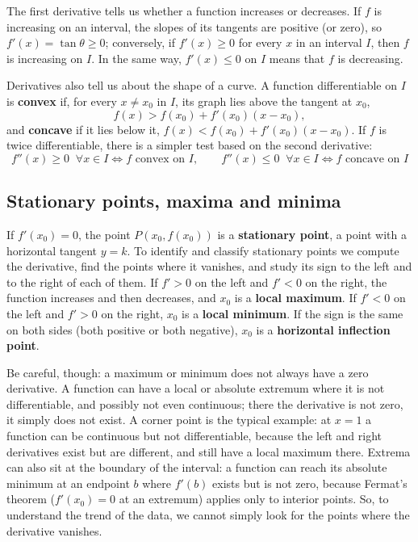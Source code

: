 \documentclass[letterpaper,11pt,leqno]{book}
\begin{document}
The first derivative tells us whether a function increases or decreases. If $f$ is increasing on an interval, the slopes of its tangents are positive (or zero), so $f'(x) = \tan\theta \ge 0$; conversely, if $f'(x) \ge 0$ for every $x$ in an interval $I$, then $f$ is increasing on $I$. In the same way, $f'(x) \le 0$ on $I$ means that $f$ is decreasing.

Derivatives also tell us about the shape of a curve. A function differentiable on $I$ is \textbf{convex} if, for every $x \neq x_0$ in $I$, its graph lies above the tangent at $x_0$,
\begin{equation}
f(x) > f(x_0) + f'(x_0)(x - x_0),
\label{eq:convexity_tangent_def}
\end{equation}
and \textbf{concave} if it lies below it, $f(x) < f(x_0) + f'(x_0)(x - x_0)$. If $f$ is twice differentiable, there is a simpler test based on the second derivative:
\begin{equation}
\boxed{f''(x) \ge 0 \;\; \forall x \in I \iff f \text{ convex on } I, \qquad f''(x) \le 0 \;\; \forall x \in I \iff f \text{ concave on } I}
\label{eq:second_derivative_convexity}
\end{equation}

\subsection{Stationary points, maxima and minima}

If $f'(x_0) = 0$, the point $P(x_0, f(x_0))$ is a \textbf{stationary point}, a point with a horizontal tangent $y = k$. To identify and classify stationary points we compute the derivative, find the points where it vanishes, and study its sign to the left and to the right of each of them. If $f' > 0$ on the left and $f' < 0$ on the right, the function increases and then decreases, and $x_0$ is a \textbf{local maximum}. If $f' < 0$ on the left and $f' > 0$ on the right, $x_0$ is a \textbf{local minimum}. If the sign is the same on both sides (both positive or both negative), $x_0$ is a \textbf{horizontal inflection point}.

Be careful, though: a maximum or minimum does not always have a zero derivative. A function can have a local or absolute extremum where it is not differentiable, and possibly not even continuous; there the derivative is not zero, it simply does not exist. A corner point is the typical example: at $x = 1$ a function can be continuous but not differentiable, because the left and right derivatives exist but are different, and still have a local maximum there. Extrema can also sit at the boundary of the interval: a function can reach its absolute minimum at an endpoint $b$ where $f'(b)$ exists but is not zero, because Fermat's theorem ($f'(x_0) = 0$ at an extremum) applies only to interior points. So, to understand the trend of the data, we cannot simply look for the points where the derivative vanishes.
\end{document}
